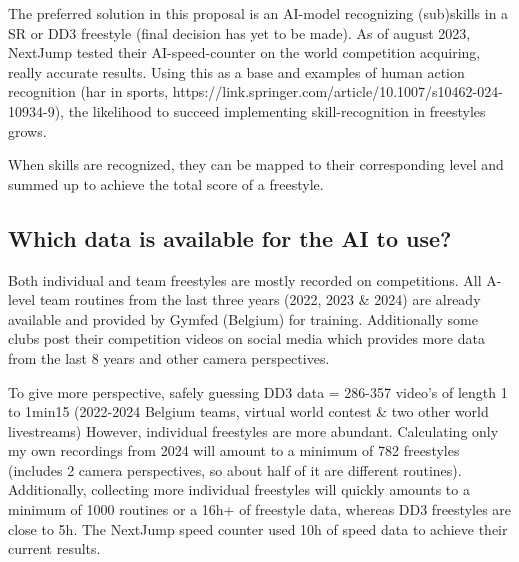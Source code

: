 The preferred solution in this proposal is an AI-model recognizing (sub)skills in a SR or DD3 freestyle (final decision has yet to be made). As of august 2023, NextJump tested their AI-speed-counter on the world competition acquiring, really accurate results.
Using this as a base and examples of human action recognition (har in sports, https://link.springer.com/article/10.1007/s10462-024-10934-9), the likelihood to succeed implementing skill-recognition in freestyles grows.

When skills are recognized, they can be mapped to their corresponding level and summed up to achieve the total score of a freestyle.

\subsection{Which data is available for the AI to use?}

Both individual and team freestyles are mostly recorded on competitions. All A-level team routines from the last three years (2022, 2023 \& 2024) are already available and provided by Gymfed (Belgium) for training. Additionally some clubs post their competition videos on social media which provides more data from the last 8 years and other camera perspectives.

To give more perspective, safely guessing DD3 data = 286-357 video's of length 1 to 1min15 (2022-2024 Belgium teams, virtual world contest \& two other world livestreams)
However, individual freestyles are more abundant. Calculating only my own recordings from 2024 will amount to a minimum of 782 freestyles (includes 2 camera perspectives, so about half of it are different routines). Additionally, collecting more individual freestyles will quickly amounts to a minimum of 1000 routines or a 16h+ of freestyle data, whereas DD3 freestyles are close to 5h. The NextJump speed counter used 10h of speed data to achieve their current results.


    
